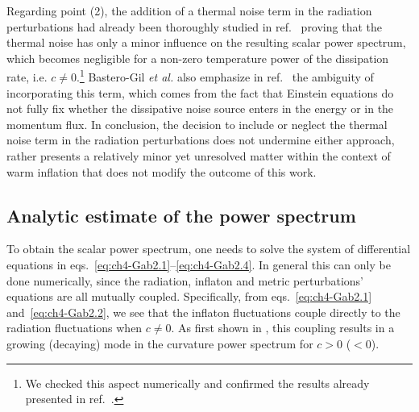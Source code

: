 Regarding point (2), the addition of a thermal noise term in the radiation perturbations had already been thoroughly studied in ref.~\cite{Bastero-Gil:2014jsa} proving that the thermal noise has only a minor influence on the resulting scalar power spectrum, which becomes negligible for a non-zero temperature power of the dissipation rate, i.e. $c\neq 0$.\footnote{We checked this aspect numerically and confirmed the results already presented in ref.~\cite{Bastero-Gil:2014jsa}.} Bastero-Gil {\it et al.} also emphasize in ref.~\cite{Bastero-Gil:2014jsa} the ambiguity of incorporating this term, which comes from the fact that Einstein equations do not fully fix whether the dissipative noise source enters in the energy or in the momentum flux. In conclusion, the decision to include or neglect the thermal noise term in the radiation perturbations does not undermine either approach, rather presents a relatively minor yet unresolved matter within the context of warm inflation that does not modify the outcome of this work.


\subsection{Analytic estimate of the power spectrum \label{sec:ch4-analytic_estimate}}

To obtain the scalar power spectrum, one  needs to solve the system of differential equations in eqs.~\eqref{eq:ch4-Gab2.1}--\eqref{eq:ch4-Gab2.4}. In general this can only be done numerically, since the radiation, inflaton and metric perturbations' equations are all mutually coupled. Specifically, from eqs.~\eqref{eq:ch4-Gab2.1} and~\eqref{eq:ch4-Gab2.2}, we see that the inflaton fluctuations couple directly to the radiation fluctuations when $c\neq 0$. As first shown in \cite{Graham:2009bf}, this coupling results in a growing (decaying) mode in the curvature power spectrum for $c>0$ ($<0$).

